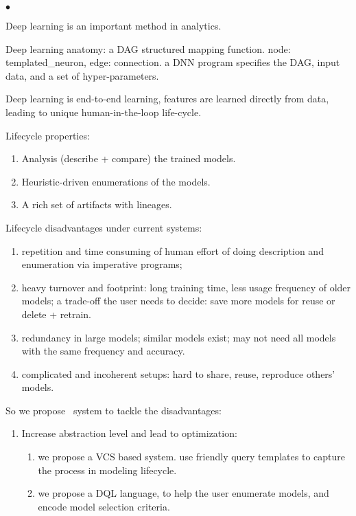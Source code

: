 \documentclass[conference]{IEEEtran}
\begin{document}
{\begin{list}{$\bullet$}{\leftmargin 0.15in \topsep 0pt \itemsep -3pt}
\item Deep learning is an important method in analytics. 
\item Deep learning anatomy: a DAG structured mapping function. node: templated\_neuron, edge: connection. a DNN program specifies the DAG, input data, and a set of hyper-parameters.
\item Deep learning is end-to-end learning, features are learned directly from data, leading to unique human-in-the-loop life-cycle. 
\item Lifecycle properties: 
\begin{enumerate}
  \item Analysis (describe + compare) the trained models.
  \item Heuristic-driven enumerations of the models. 
  \item A rich set of artifacts with lineages.
\end{enumerate}
\item Lifecycle disadvantages under current systems: 
\begin{enumerate}
  \item repetition and time consuming of human effort of doing description and enumeration via imperative programs;
  \item heavy turnover and footprint: long training time, less usage frequency of older models; a trade-off the user needs to decide: save more models for reuse or delete + retrain.
  \item redundancy in large models; similar models exist; may not need all models with the same frequency and accuracy. 
  \item complicated and incoherent setups: hard to share, reuse, reproduce others' models. 
\end{enumerate}
\item So we propose \modelhub\ system to tackle the disadvantages:
\begin{enumerate}
  \item Increase abstraction level and lead to optimization: 
  \begin{enumerate}
    \item we propose a VCS based system. use friendly query templates to capture the process in modeling lifecycle.
    \item we propose a DQL language, to help the user enumerate models, and encode model selection criteria. 
  \end{enumerate}

\end{enumerate}
\end{list}}
\end{document}

